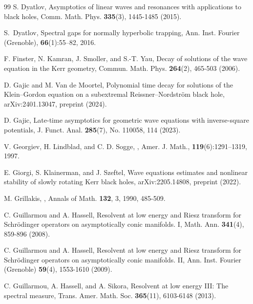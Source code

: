 \documentclass[10pt,a4paper,reqno]{amsart}
\theoremstyle{definition}
\theoremstyle{remark}
\numberwithin{equation}{section}
\begin{document}
\begin{thebibliography}{99}
 S. Dyatlov,
\newblock Asymptotics of linear waves and resonances with applications to black holes,
\newblock Comm. Math. Phys. \textbf{335}(3), 1445-1485 (2015). %

 S.~Dyatlov,
\newblock Spectral gaps for normally hyperbolic trapping,
\newblock Ann. Inst. Fourier (Grenoble), \textbf{66}(1):55--82, 2016.

 F. Finster, N. Kamran, J. Smoller, and S.-T. Yau,
\newblock Decay of solutions of the wave equation in the Kerr geometry,
\newblock Commun. Math. Phys. \textbf{264}(2), 465-503 (2006).%


 D. Gajic and M. Van de Moortel,
\newblock Polynomial time decay for solutions of the Klein–Gordon equation on a subextremal Reissner–Nordström black hole,
\newblock arXiv:2401.13047, preprint (2024). %

 D. Gajic,
\newblock Late-time asymptotics for geometric wave equations with inverse-square potentials,
\newblock J. Funct. Anal. \textbf{285}(7), No. 110058, 114 (2023). %

 V. Georgiev, H. Lindblad, and C. D. Sogge,
,
\newblock Amer. J. Math., \textbf{119}(6):1291--1319, 1997.

 E. Giorgi, S. Klainerman, and J. Szeftel,
\newblock Wave equations estimates and nonlinear stability of slowly rotating Kerr black holes,
\newblock arXiv:2205.14808, preprint (2022).

 M. Grillakis,
,
\newblock Annals of Math. \textbf{132}, 3, 1990, 485-509. %

 C. Guillarmou and A. Hassell,
\newblock Resolvent at low energy and Riesz transform for Schrödinger operators on asymptotically conic manifolds. I,
\newblock Math. Ann. \textbf{341}(4), 859-896 (2008).

 C. Guillarmou and A. Hassell,
\newblock Resolvent at low energy and Riesz transform for Schrödinger operators on asymptotically conic manifolds. II,
\newblock Ann. Inst. Fourier (Grenoble) \textbf{59}(4), 1553-1610 (2009).

 C. Guillarmou, A. Hassell, and A. Sikora,
\newblock Resolvent at low energy III: The spectral measure,
\newblock Trans. Amer. Math. Soc. \textbf{365}(11), 6103-6148 (2013).



\end{thebibliography}
\end{document}
